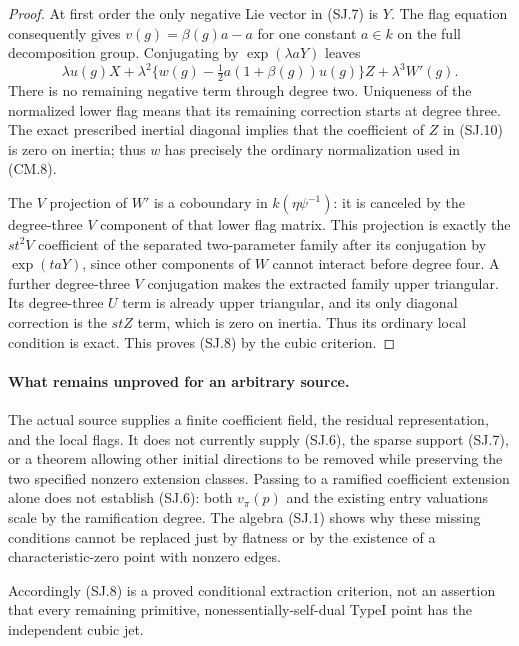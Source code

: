 \begin{proof}
At first order the only negative Lie vector in (SJ.7)
is $Y$.  The flag equation consequently gives
$v(g)=\beta(g)a-a$ for one constant $a\in k$ on the full
decomposition group.  Conjugating by $\exp(\lambda aY)$
leaves
\[
 \lambda u(g)X+\lambda^2
       \{w(g)-\tfrac12a(1+\beta(g))u(g)\}Z
                       +\lambda^3W'(g).                       \tag{SJ.10}
\]
There is no remaining negative term through degree two.
Uniqueness of the normalized lower flag means that its
remaining correction starts at degree three.
The exact prescribed inertial diagonal implies that
the coefficient of $Z$ in (SJ.10) is zero on inertia;
thus $w$ has precisely the ordinary normalization used
in (CM.8).

The $V$ projection of $W'$ is a coboundary in
$k(\eta\psi^{-1})$: it is canceled by the degree-three
$V$ component of that lower flag matrix.
This projection is exactly the $st^2V$ coefficient of
the separated two-parameter family after its conjugation
by $\exp(t aY)$, since other components of $W$ cannot
interact before degree four.
A further degree-three $V$ conjugation makes the
extracted family upper triangular.
Its degree-three $U$ term is already upper triangular,
and its only diagonal correction is the $stZ$ term,
which is zero on inertia.  Thus its ordinary local
condition is exact.  This proves (SJ.8) by the cubic
criterion.
\end{proof}

\paragraph{What remains unproved for an arbitrary source.}
The actual source supplies a finite coefficient field,
the residual representation, and the local flags.
It does not currently supply (SJ.6), the sparse support
(SJ.7), or a theorem allowing other initial directions
to be removed while preserving the two specified
nonzero extension classes.
Passing to a ramified coefficient extension alone does
not establish (SJ.6): both $v_\pi(p)$ and the existing
entry valuations scale by the ramification degree.
The algebra (SJ.1) shows why these missing conditions
cannot be replaced just by flatness or by the existence
of a characteristic-zero point with nonzero edges.

Accordingly (SJ.8) is a proved conditional extraction
criterion, not an assertion that every remaining
primitive, nonessentially-self-dual TypeI point has
the independent cubic jet.

